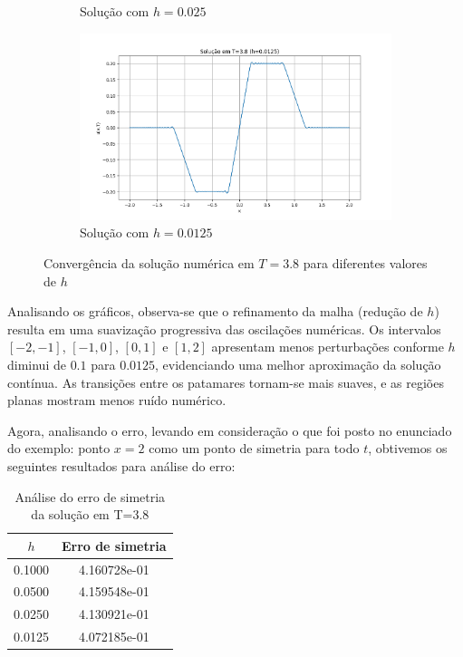 \documentclass[column,amsmath,amssymb,floatfix]{revtex4}
\begin{document}
\begin{figure}[H]
\begin{subfigure}{0.35\textwidth}
		\caption{Solução com $h=0.025$}
		\label{fig:ex2_3}
	\end{subfigure}
	\begin{subfigure}{0.35\textwidth}
		\includegraphics[width=\textwidth]{img/ex0204.png}
		\caption{Solução com $h=0.0125$}
		\label{fig:ex2_4}
	\end{subfigure}
	\caption{Convergência da solução numérica em $T=3.8$ para diferentes valores de $h$}
	\label{fig:ex2_conv}
\end{figure}

Analisando os gráficos, observa-se que o refinamento da malha (redução de $h$) resulta em uma suavização progressiva das oscilações numéricas. Os intervalos $[-2,-1]$, $[-1,0]$, $[0,1]$ e $[1,2]$ apresentam menos perturbações conforme $h$ diminui de $0.1$ para $0.0125$, evidenciando uma melhor aproximação da solução contínua. As transições entre os patamares tornam-se mais suaves, e as regiões planas mostram menos ruído numérico.

Agora, analisando o erro, levando em consideração o que foi posto no enunciado do exemplo: ponto $x=2$ como um ponto de simetria para todo $t$, obtivemos os seguintes resultados para análise do erro:

\begin{table}[H]
	\centering
	\caption{Análise do erro de simetria da solução em T=3.8}
	\label{tab:erro_simetria}
	\renewcommand{\arraystretch}{1.25}
	\setlength{\tabcolsep}{12pt}
	\begin{tabular}{|c|c|}
		\hline
		\textbf{$h$} & \textbf{Erro de simetria} \\ \hline
		0.1000       & 4.160728e-01              \\ \hline
		0.0500       & 4.159548e-01              \\ \hline
		0.0250       & 4.130921e-01              \\ \hline
		0.0125       & 4.072185e-01              \\ \hline
	\end{tabular}
\end{table}
\end{document}

